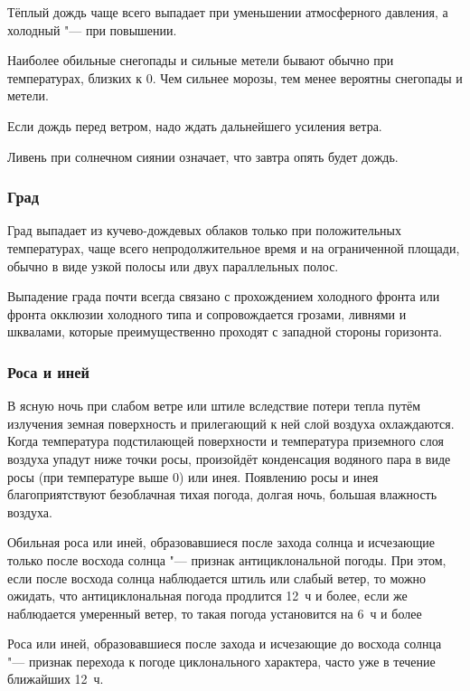  Тёплый дождь чаще всего выпадает при уменьшении атмосферного
давления, а холодный "--- при повышении.

 Наиболее обильные снегопады и сильные метели бывают обычно при
температурах, близких к 0\grC. Чем сильнее морозы, тем менее вероятны
снегопады и метели.

 Если дождь перед ветром, надо ждать дальнейшего усиления ветра.

 Ливень при солнечном сиянии означает, что завтра опять будет дождь.

\subsubsection{Град}

Град выпадает из кучево-дождевых облаков только при положительных
температурах, чаще всего непродолжительное время и на ограниченной
площади, обычно в виде узкой полосы или двух параллельных полос.

 Выпадение града почти всегда связано с прохождением холодного
фронта или фронта окклюзии холодного типа и сопровождается грозами,
ливнями и шквалами, которые преимущественно проходят с западной
стороны горизонта.

\subsubsection{Роса и иней}

В ясную ночь при слабом ветре или штиле вследствие потери тепла путём
излучения земная поверхность и прилегающий к ней слой воздуха
охлаждаются. Когда температура подстилающей поверхности и температура
приземного слоя воздуха упадут ниже точки росы, произойдёт конденсация
водяного пара в виде росы (при температуре выше 0\grC) или инея. Появлению
росы и инея благоприятствуют безоблачная тихая погода, долгая ночь,
большая влажность воздуха.

 Обильная роса или иней, образовавшиеся после захода солнца и
исчезающие только после восхода солнца "--- признак антициклональной
погоды. При этом, если после восхода солнца наблюдается штиль или
слабый ветер, то можно ожидать, что антициклональная погода продлится
12~ч и более, если же наблюдается умеренный ветер, то такая погода
установится на 6~ч и более

 Роса или иней, образовавшиеся после захода и исчезающие до
восхода солнца "--- признак перехода к погоде циклонального характера,
часто уже в течение ближайших 12~ч.


